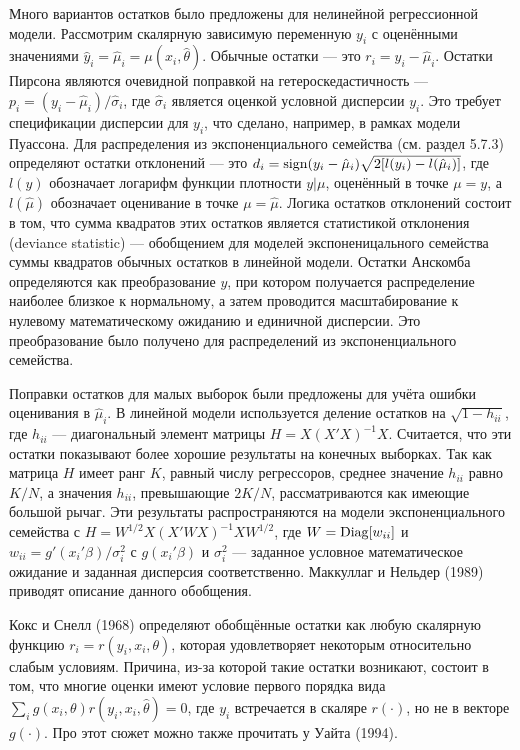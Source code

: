 Много вариантов остатков было предложены для нелинейной регрессионной модели. Рассмотрим скалярную зависимую переменную $y_i$ с оценёнными значениями $\hat{y}_i = \hat{\mu}_i = \mu(x_i, \hat{\theta})$. Обычные остатки --- это $r_i = y_i - \hat{\mu}_i$. Остатки Пирсона являются очевидной поправкой на гетероскедастичность --- $p_i = (y_i - \hat{\mu}_i)/\hat{\sigma}_i$, где $\hat{\sigma}_i$ является оценкой условной дисперсии $y_i$. Это требует  спецификации дисперсии для $y_i$, что сделано, например, в рамках модели Пуассона. Для распределения из экспоненциального семейства (см. раздел 5.7.3) определяют остатки отклонений --- это $d_i = \mathrm{sign}(y_i - \hat{\mu}_i)\sqrt{2[l(y_i) - l(\hat{\mu}_i)]}$, где $l(y)$ обозначает логарифм функции плотности $y|\mu$, оценённый в точке $\mu = y$, а $l(\hat{\mu})$ обозначает оценивание в точке $\mu = \hat{\mu}$. Логика остатков отклонений состоит в том, что сумма квадратов этих остатков является статистикой отклонения (deviance statistic) --- обобщением для моделей экспоненицального семейства суммы квадратов обычных остатков в линейной модели. Остатки Анскомба определяются как преобразование $y$, при котором получается распределение наиболее близкое к нормальному, а затем проводится масштабирование к нулевому математическому ожиданию и единичной дисперсии. Это преобразование было получено для распределений из экспоненциального семейства.

Поправки остатков для малых выборок были предложены для учёта ошибки оценивания в $\hat{\mu}_i$. В линейной модели используется деление остатков на $\sqrt{1 - h_{ii}}$, где $h_{ii}$ --- диагональный элемент матрицы $H = X(X'X)^{-1}X$. Считается, что эти остатки показывают более хорошие результаты на конечных выборках. Так как матрица $H$ имеет ранг $K$, равный числу регрессоров, среднее значение $h_{ii}$ равно $K/N$, а значения $h_{ii}$, превышающие $2K/N$, рассматриваются как имеющие большой рычаг. Эти результаты распространяются на модели экспоненциального семейства с $H = W^{1/2}X(X'WX)^{-1}XW^{1/2}$, где $W = \mathrm{Diag}[w_{ii}]$ и $w_{ii} = g'(x_i'\beta)/\sigma_i^2$ с $g(x_i'\beta)$ и $\sigma_i^2$ --- заданное условное математическое ожидание и заданная дисперсия соответственно. Маккуллаг и Нельдер (1989) приводят описание данного обобщения.

Кокс и Снелл (1968) определяют обобщённые остатки как любую скалярную функцию $r_i = r(y_i, x_i, \theta)$, которая удовлетворяет некоторым относительно слабым условиям. Причина, из-за которой такие остатки возникают, состоит в том, что многие оценки имеют условие первого порядка вида $\sum_i g(x_i, \theta)r(y_i, x_i, \hat{\theta}) = 0$, где $y_i$ встречается в скаляре $r(\cdot)$, но не в векторе $g(\cdot)$. Про этот сюжет можно также прочитать у Уайта (1994).

